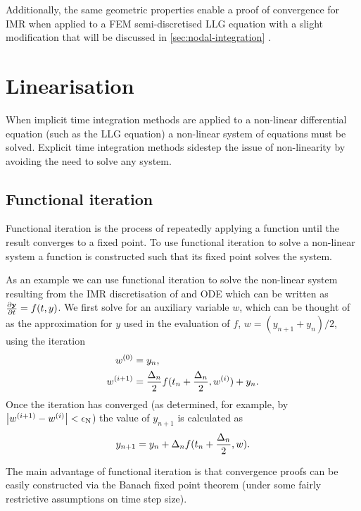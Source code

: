 Additionally, the same geometric properties enable a proof of convergence for IMR when applied to a FEM semi-discretised LLG equation with a slight modification that will be discussed in \cref{sec:nodal-integration} \cite{Bartels2006}.


\section{Linearisation}
\label{sec:linearisation}

When implicit time integration methods are applied to a non-linear differential equation (such as the LLG equation) a non-linear system of equations must be solved.
Explicit time integration methods sidestep the issue of non-linearity by avoiding the need to solve any system.


\subsection{Functional iteration}
\label{sec:picard}

\newcommand{\wconv}{w}

Functional iteration is the process of repeatedly applying a function until the result converges to a fixed point.
To use functional iteration to solve a non-linear system a function is constructed such that its fixed point solves the system.

As an example we can use functional iteration to solve the non-linear system resulting from the IMR discretisation of and ODE which can be written as $\frac{\partial \mathbf{y}}{\partial t} = f(t,y)$.
We first solve for an auxiliary variable $\wconv$, which can be thought of as the approximation for $y$ used in the evaluation of $f$, \ie $\wconv = (y_{n+1} + y_n)/2$, using the iteration
\begin{equation}
  \begin{aligned}
    {w}^{(0)} &= y_n, \\
    {w}^{(i+1)} &= \frac{\Delta_{n}}{2} f(t_n + \frac{\Delta_{n}}{2}, {w}^{(i)}) + y_n.
  \end{aligned} 
\end{equation}
Once the iteration has converged (as determined, for example, by $\left|{{w}^{(i+1)} - {w}^{(i)}} \right| < \epsilon_{\text{N}}$) the value of $y_{n+1}$ is calculated as
\begin{equation}
  y_{n+1} = y_n + \dtn f(t_n + \frac{\dtn}{2}, \wconv).
\end{equation}

The main advantage of functional iteration is that convergence proofs can be easily constructed via the Banach fixed point theorem (under some fairly restrictive assumptions on time step size).

